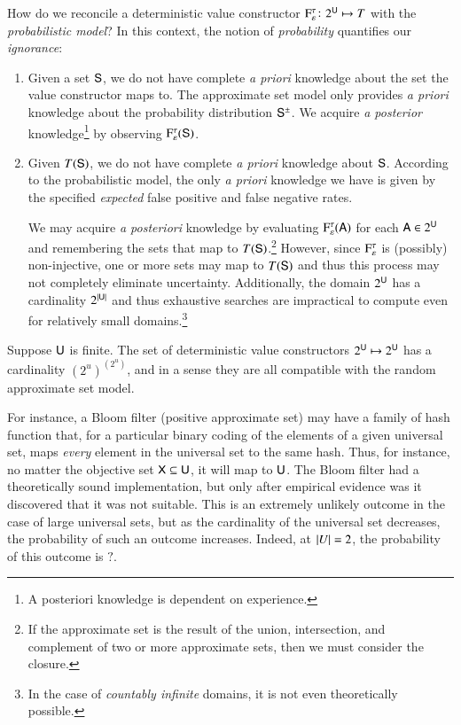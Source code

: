 \documentclass[10pt,final,hidelinks]{article}
\numberwithin{equation}{section}
\DeclarePairedDelimiter\Card{\lvert}{\rvert}
\newcommand{\PS}[1]{2^{#1}}
\newcommand{\tprate}{\tau}
\newcommand{\fprate}{\varepsilon}
\theoremstyle{plain}
\begin{document}
How do we reconcile a deterministic value constructor $\ctor{\fprate}{\tprate} \colon \PS{\Set{U}} \mapsto T$ with the \emph{probabilistic model}?
In this context, the notion of \emph{probability} quantifies our \emph{ignorance}:
\begin{enumerate}
\item Given a set $\Set{S}$, we do not have complete \emph{a priori} knowledge about the set the value constructor maps to.
The approximate set model only provides \emph{a priori} knowledge about the probability distribution $\ASet{S}$.
We acquire \emph{a posterior} knowledge\footnote{A posteriori knowledge is dependent on experience.} by observing $\ctor{\fprate}{\tprate}(\Set{S})$.

\item Given $T(\Set{S})$, we do not have complete \emph{a priori} knowledge about $\Set{S}$.
According to the probabilistic model, the only \emph{a priori} knowledge we have is given by the specified \emph{expected} false positive and false negative rates.

We may acquire \emph{a posteriori} knowledge by evaluating $\ctor{\fprate}{\tprate}(\Set{A})$ for each $\Set{A} \in \PS{\Set{U}}$ and remembering the sets that map to $T(\Set{S})$.\footnote{If the approximate set is the result of the union, intersection, and complement of two or more approximate sets, then we must consider the closure.}
However, since $\ctor{\fprate}{\tprate}$ is (possibly) non-injective, one or more sets may map to $T(\Set{S})$ and thus this process may not completely eliminate uncertainty.
Additionally, the domain $\PS{\Set{U}}$ has a cardinality $2^{\Card{\Set{U}}}$ and thus exhaustive searches are impractical to compute even for relatively small domains.\footnote{In the case of \emph{countably infinite} domains, it is not even theoretically possible.}
\end{enumerate}

Suppose $\Set{U}$ is finite. The set of deterministic value constructors $\PS{\Set{U}} \mapsto \PS{\Set{U}}$ has a cardinality $(2^u)^(2^u)$, and in a sense they are all compatible with the random approximate set model.

For instance, a Bloom filter (positive approximate set) may have a family of hash function that, for a particular binary coding of the elements of a given universal set, maps \emph{every} element in the universal set to the same hash.
Thus, for instance, no matter the objective set $\Set{X} \subseteq \Set{U}$, it will map to $\Set{U}$.
The Bloom filter had a theoretically sound implementation, but only after empirical evidence was it discovered that it was not suitable.
This is an extremely unlikely outcome in the case of large universal sets, but as the cardinality of the universal set decreases, the probability of such an outcome increases.
Indeed, at $\Card{U} = 2$, the probability of this outcome is $?$.
\end{document}

